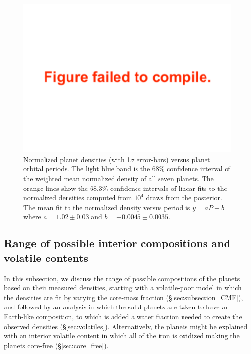 \documentclass[twocolumn]{aastex63}
\begin{document}
\begin{figure}
    \centering
    \includegraphics[width=\hsize]{figures/Norm_dens_vs_period.pdf}
    {Normalized planet densities (with 1$\sigma$ error-bars) versus planet orbital periods. The light blue band is the 68\% confidence interval of the weighted mean normalized density of all seven planets.  The orange lines show the 68.3\% confidence intervals of linear fits to the normalized densities computed from $10^4$
        draws from the posterior.  The mean fit to the normalized density versus period is $y = a P + b$ where $a= 1.02\pm 0.03$ and $b=-0.0045\pm0.0035$.}
    \label{fig:norm_density_vs_period}
\end{figure}


\subsection{Range of possible interior compositions and volatile contents}  \label{sec:interior_compositions}

In this subsection, we discuss the range of possible compositions of the planets based on their measured densities,
starting with a volatile-poor model in which the densities are fit by varying the core-mass fraction (\S \ref{sec:subsection_CMF}),
and followed by an analysis in which the solid planets are taken to have an Earth-like composition, to which is added a water fraction needed to create the observed densities (\S \ref{sec:volatiles}). %
Alternatively, the planets might be explained with an interior volatile content in which all of the iron is oxidized making the planets core-free (\S \ref{sec:core_free}).
\end{document}
